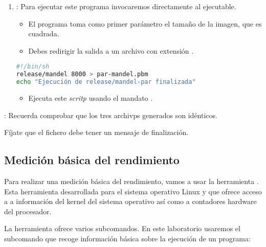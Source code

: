 \begin{enumerate}
  \item {}: Para ejecutar este programa invocaremos directamente al
        ejecutable.
    \begin{itemize}
      \item El programa toma como primer parámetro el tamaño de la imagen, que es cuadrada.
      \item Debes redirigir la salida a un archivo con extensión .
    \end{itemize}

\begin{lstlisting}[language=bash,title={Archivo run-par-mandel.sh},frame=single]
#!/bin/sh
release/mandel 8000 > par-mandel.pbm
echo "Ejecución de release/mandel-par finalizada"
\end{lstlisting}
    \begin{itemize}
      \item Ejecuta este \emph{scritp} usando el mandato .
    \end{itemize}
\end{enumerate}


: Recuerda comprobar que los tres archivps 
generados son idénticos.

Fíjate que el fichero  debe tener un mensaje de finalización.

\subsection{Medición básica del rendimiento}

Para realizar una medición básica del rendimiento, vamos a usar la
herramienta . Esta herramienta desarrollada para el sistema
operativo Linux y que ofrece acceso a a información del kernel
del sistema operativo así como a contadores hardware del procesador.

La herramienta  ofrece varios subcomandos. En este
laboratorio usaremos el subcomando  que recoge información
básica sobre la ejecución de un programa:

